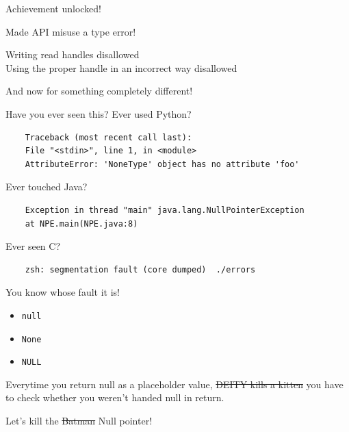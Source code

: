 \documentclass{beamer}
\begin{document}
\begin{frame}{Achievement unlocked!}
  \begin{center}
    {\Huge Made API misuse a type error!}
  \end{center}
  \checkmark Writing read handles disallowed\\
  \checkmark Using the proper handle in an incorrect way disallowed
\end{frame}

\begin{frame}
  \begin{center}
    {\Huge And now for something completely different!}
  \end{center}
\end{frame}

\begin{frame}[fragile]{Have you ever seen this?}
  Ever used Python?
  \begin{verbatim}
    Traceback (most recent call last):
    File "<stdin>", line 1, in <module>
    AttributeError: 'NoneType' object has no attribute 'foo'
  \end{verbatim}
  \pause
  Ever touched Java?
  \begin{verbatim}
    Exception in thread "main" java.lang.NullPointerException
    at NPE.main(NPE.java:8)
  \end{verbatim}
  \pause
  Ever seen C?
  \begin{verbatim}
    zsh: segmentation fault (core dumped)  ./errors
  \end{verbatim}
\end{frame}

\begin{frame}{You know whose fault it is!}
  \begin{itemize}
    \item \texttt{null}
    \item \texttt{None}
    \item \texttt{NULL}
  \end{itemize}
  \pause
  Everytime you return null as a placeholder value, 
  \sout{\textdollar{}DEITY kills a kitten}
  you have to check whether you weren't handed null in return.
\end{frame}

\begin{frame}
  \begin{center}
    {\Huge Let's kill the \sout{Batman} Null pointer!}
  \end{center}
\end{frame}
\end{document}
